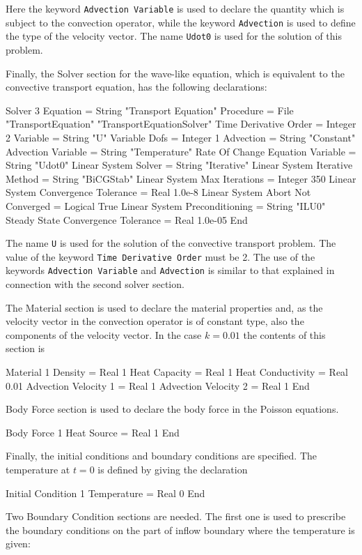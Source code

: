 Here the keyword {\tt Advection Variable} is used to declare the quantity
which is subject to the convection operator, while the keyword {\tt Advection}
is used to define the type of the velocity vector.
The name {\tt Udot0} is used for the solution of this problem.

Finally, the Solver section for the wave-like equation, which is equivalent to 
the convective transport equation, has the following declarations:

\ttbegin
Solver 3  
  Equation = String "Transport Equation"
  Procedure = File "TransportEquation" "TransportEquationSolver"
  Time Derivative Order = Integer 2
  Variable = String "U"
  Variable Dofs = Integer 1  
  Advection = String "Constant"
  Advection Variable = String "Temperature" 
  Rate Of Change Equation Variable = String "Udot0" 
  Linear System Solver = String "Iterative"
  Linear System Iterative Method = String "BiCGStab"
  Linear System Max Iterations = Integer 350
  Linear System Convergence Tolerance = Real 1.0e-8
  Linear System Abort Not Converged = Logical True
  Linear System Preconditioning = String "ILU0"
  Steady State Convergence Tolerance = Real 1.0e-05
End
\ttend

The name {\tt U} is used for the solution of the convective transport problem. 
The value of the keyword {\tt Time Derivative Order} must be 2.
The use of the keywords {\tt Advection Variable} and {\tt Advection}
is similar to that explained in connection with the second solver section.  

The Material section is used to declare the material properties and,
as the velocity vector in the convection operator is of constant type,
also the components of the velocity vector. In the case $k=0.01$ the contents 
of this section is  

\ttbegin
Material 1
  Density = Real 1
  Heat Capacity = Real 1
  Heat Conductivity = Real 0.01
  Advection Velocity 1 = Real 1
  Advection Velocity 2 = Real 1
End
\ttend

Body Force section is used to declare the body force in the Poisson
equations.

\ttbegin
Body Force 1
  Heat Source = Real 1
End
\ttend

Finally, the initial conditions and boundary conditions are specified. 
The temperature at $t=0$ is defined by giving the declaration  

\ttbegin
Initial Condition 1
  Temperature = Real 0
End
\ttend

Two Boundary Condition sections are needed. The first one is used 
to prescribe the boundary conditions on the part of inflow boundary where
the temperature is given: 

